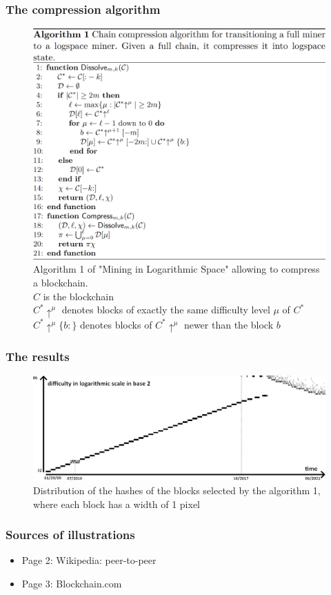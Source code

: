 \documentclass{beamer}
\begin{document}
\begin{frame}

\frametitle{The compression algorithm}

\begin{figure}[H]
		\includegraphics[width=0.7\linewidth]{illustrations/algo1.png}
		\caption{Algorithm 1 of "Mining in Logarithmic Space" allowing to compress a blockchain.\\$C$ is the blockchain\\$C^*\uparrow^\mu$ denotes blocks of exactly the same difficulty level $\mu$ of $C^*$\\$C^*\uparrow^\mu\{b:\}$ denotes blocks of $C^*\uparrow^\mu$ newer than the block $b$}
	\end{figure}

\end{frame}


\begin{frame}

\frametitle{The results}

\begin{figure}[H]
		\includegraphics[width=\linewidth]{illustrations/piXEn.png}
		\caption{Distribution of the hashes of the blocks selected by the algorithm 1, where each block has a width of 1 pixel}%
	\end{figure}

\end{frame}


\begin{frame}

\frametitle{Sources of illustrations}

	\begin{itemize}
		\item Page 2: Wikipedia: peer-to-peer
		\item Page 3: Blockchain.com
	\end{itemize}
\end{frame}
\end{document}
